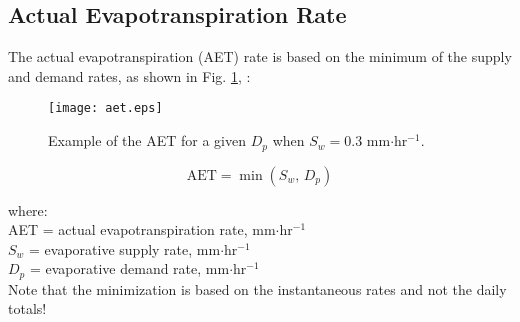 \subsection{Actual Evapotranspiration Rate}
\label{sec:aet}
The actual evapotranspiration (AET) rate is based on the minimum of the supply and demand rates, as shown in Fig. \ref{fig:aet}, \parencite[Eq. 7]{federer82}:

\begin{figure}[ht!]
    \texttt{[image: aet.eps]}
    \caption{Example of the AET for a given $D_p$ when $S_w = 0.3$ mm$\cdot$hr$^{-1}$.}
    \label{fig:aet}
\end{figure}

\begin{equation}
\label{eq:aet}
	\text{AET} = \min\left(S_w\text{, }D_p\right)
\end{equation}

\noindent where:\\
\indent AET = actual evapotranspiration rate, mm$\cdot$hr$^{-1}$\\
\indent $S_w$ = evaporative supply rate, mm$\cdot$hr$^{-1}$\\
\indent $D_p$ = evaporative demand rate, mm$\cdot$hr$^{-1}$\\

\noindent Note that the minimization is based on the instantaneous rates and not the daily totals!

